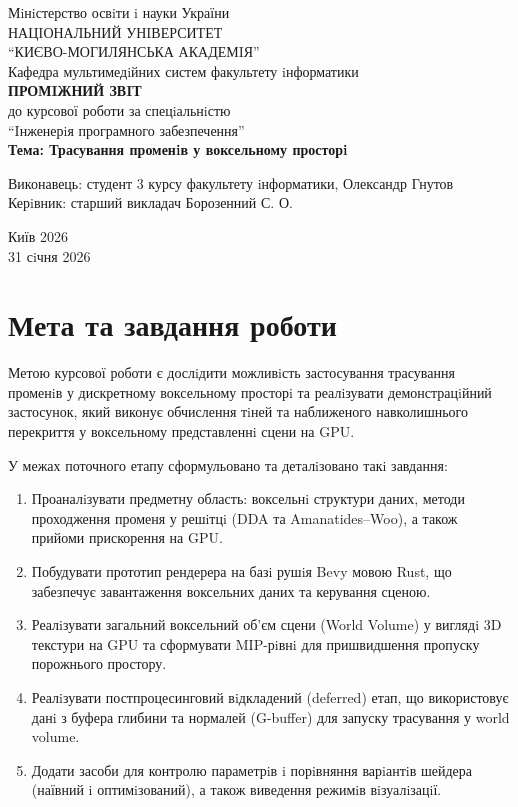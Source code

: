 \documentclass[a4paper,12pt]{article}
\begin{document}
\begin{titlepage}
\begin{center}
Мiнiстерство освiти i науки України\\
НАЦIОНАЛЬНИЙ УНIВЕРСИТЕТ\\
\textquotedblleft КИЄВО-МОГИЛЯНСЬКА АКАДЕМIЯ\textquotedblright \\
Кафедра мультимедiйних систем факультету iнформатики\\[7em]
\textbf{ПРОМIЖНИЙ ЗВIТ}\\[0.4em]
до курсової роботи за спецiальнiстю \\\textquotedblleft Iнженерiя програмного забезпечення\textquotedblright \\[0.6em]
\textbf{Тема: Трасування променiв у воксельному просторi}\\[2.0em]
\end{center}

\begin{flushleft}
Виконавець: студент 3 курсу факультету iнформатики, Олександр Гнутов\\
Керiвник: старший викладач Борозенний С. О.
\end{flushleft}

\vfill
\begin{center}
Київ 2026\\
31 сiчня 2026
\end{center}
\end{titlepage}

\section*{Мета та завдання роботи}
Метою курсової роботи є дослiдити можливiсть застосування трасування променiв у дискретному воксельному просторi та реалiзувати демонстрацiйний застосунок, який виконує обчислення тiней та наближеного навколишнього перекриття у воксельному представленнi сцени на GPU.

У межах поточного етапу сформульовано та деталiзовано такi завдання:
\begin{enumerate}
\item Проаналiзувати предметну область: воксельнi структури даних, методи проходження променя у решiтцi (DDA та Amanatides--Woo), а також прийоми прискорення на GPU.
\item Побудувати прототип рендерера на базi рушiя Bevy мовою Rust, що забезпечує завантаження воксельних даних та керування сценою.
\item Реалiзувати загальний воксельний об’єм сцени (World Volume) у виглядi 3D текстури на GPU та сформувати MIP-рiвнi для пришвидшення пропуску порожнього простору.
\item Реалiзувати постпроцесинговий вiдкладений (deferred) етап, що використовує данi з буфера глибини та нормалей (G-buffer) для запуску трасування у world volume.
\item Додати засоби для контролю параметрiв i порiвняння варiантiв шейдера (наївний i оптимiзований), а також виведення режимiв вiзуалiзацiї.
\end{enumerate}
\end{document}
